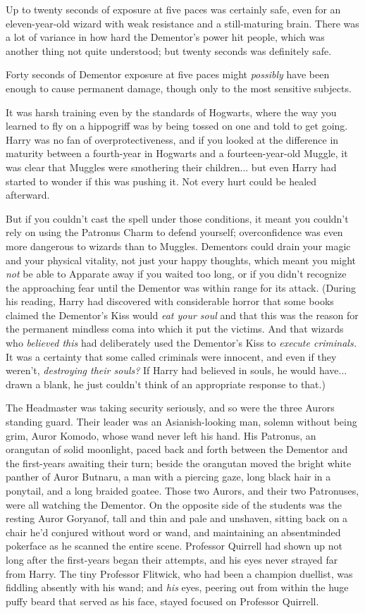 Up to twenty seconds of exposure at five paces was certainly safe, even
for an eleven-year-old wizard with weak resistance and a still-maturing
brain. There was a lot of variance in how hard the Dementor's power hit
people, which was another thing not quite understood; but twenty seconds
was definitely safe.

Forty seconds of Dementor exposure at five paces might \emph{possibly}
have been enough to cause permanent damage, though only to the most
sensitive subjects.

It was harsh training even by the standards of Hogwarts, where the way
you learned to fly on a hippogriff was by being tossed on one and told
to get going. Harry was no fan of overprotectiveness, and if you looked
at the difference in maturity between a fourth-year in Hogwarts and a
fourteen-year-old Muggle, it was clear that Muggles were smothering
their children... but even Harry had started to wonder if this was
pushing it. Not every hurt could be healed afterward.

But if you couldn't cast the spell under those conditions, it meant you
couldn't rely on using the Patronus Charm to defend yourself;
overconfidence was even more dangerous to wizards than to Muggles.
Dementors could drain your magic and your physical vitality, not just
your happy thoughts, which meant you might \emph{not} be able to
Apparate away if you waited too long, or if you didn't recognize the
approaching fear until the Dementor was within range for its attack.
(During his reading, Harry had discovered with considerable horror that
some books claimed the Dementor's Kiss would \emph{eat your soul} and
that this was the reason for the permanent mindless coma into which it
put the victims. And that wizards who \emph{believed this} had
deliberately used the Dementor's Kiss to \emph{execute criminals.} It
was a certainty that some called criminals were innocent, and even if
they weren't, \emph{destroying their souls?} If Harry had believed in
souls, he would have... drawn a blank, he just couldn't think of an
appropriate response to that.)

The Headmaster was taking security seriously, and so were the three
Aurors standing guard. Their leader was an Asianish-looking man, solemn
without being grim, Auror Komodo, whose wand never left his hand. His
Patronus, an orangutan of solid moonlight, paced back and forth between
the Dementor and the first-years awaiting their turn; beside the
orangutan moved the bright white panther of Auror Butnaru, a man with a
piercing gaze, long black hair in a ponytail, and a long braided goatee.
Those two Aurors, and their two Patronuses, were all watching the
Dementor. On the opposite side of the students was the resting Auror
Goryanof, tall and thin and pale and unshaven, sitting back on a chair
he'd conjured without word or wand, and maintaining an absentminded
pokerface as he scanned the entire scene. Professor Quirrell had shown
up not long after the first-years began their attempts, and his eyes
never strayed far from Harry. The tiny Professor Flitwick, who had been
a champion duellist, was fiddling absently with his wand; and \emph{his}
eyes, peering out from within the huge puffy beard that served as his
face, stayed focused on Professor Quirrell.

